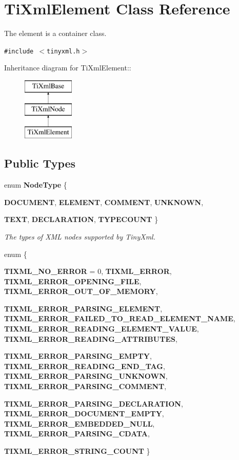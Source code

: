 \section{Ti\-Xml\-Element Class Reference}
\label{classTiXmlElement}
The element is a container class.  


{\tt \#include $<$tinyxml.h$>$}

Inheritance diagram for Ti\-Xml\-Element::\begin{figure}[H]
\begin{center}
\leavevmode
\includegraphics[height=3cm]{classTiXmlElement}
\end{center}
\end{figure}
\subsection*{Public Types}
\begin{CompactItemize}
\item 
enum {\bf Node\-Type} \{ \par
{\bf DOCUMENT}, 
{\bf ELEMENT}, 
{\bf COMMENT}, 
{\bf UNKNOWN}, 
\par
{\bf TEXT}, 
{\bf DECLARATION}, 
{\bf TYPECOUNT}
 \}
\begin{CompactList}\small\item\em The types of XML nodes supported by Tiny\-Xml. \item\end{CompactList}\item 
enum \{ \par
{\bf TIXML\_\-NO\_\-ERROR} =  0, 
{\bf TIXML\_\-ERROR}, 
{\bf TIXML\_\-ERROR\_\-OPENING\_\-FILE}, 
{\bf TIXML\_\-ERROR\_\-OUT\_\-OF\_\-MEMORY}, 
\par
{\bf TIXML\_\-ERROR\_\-PARSING\_\-ELEMENT}, 
{\bf TIXML\_\-ERROR\_\-FAILED\_\-TO\_\-READ\_\-ELEMENT\_\-NAME}, 
{\bf TIXML\_\-ERROR\_\-READING\_\-ELEMENT\_\-VALUE}, 
{\bf TIXML\_\-ERROR\_\-READING\_\-ATTRIBUTES}, 
\par
{\bf TIXML\_\-ERROR\_\-PARSING\_\-EMPTY}, 
{\bf TIXML\_\-ERROR\_\-READING\_\-END\_\-TAG}, 
{\bf TIXML\_\-ERROR\_\-PARSING\_\-UNKNOWN}, 
{\bf TIXML\_\-ERROR\_\-PARSING\_\-COMMENT}, 
\par
{\bf TIXML\_\-ERROR\_\-PARSING\_\-DECLARATION}, 
{\bf TIXML\_\-ERROR\_\-DOCUMENT\_\-EMPTY}, 
{\bf TIXML\_\-ERROR\_\-EMBEDDED\_\-NULL}, 
{\bf TIXML\_\-ERROR\_\-PARSING\_\-CDATA}, 
\par
{\bf TIXML\_\-ERROR\_\-STRING\_\-COUNT}
 \}
\end{CompactItemize}
